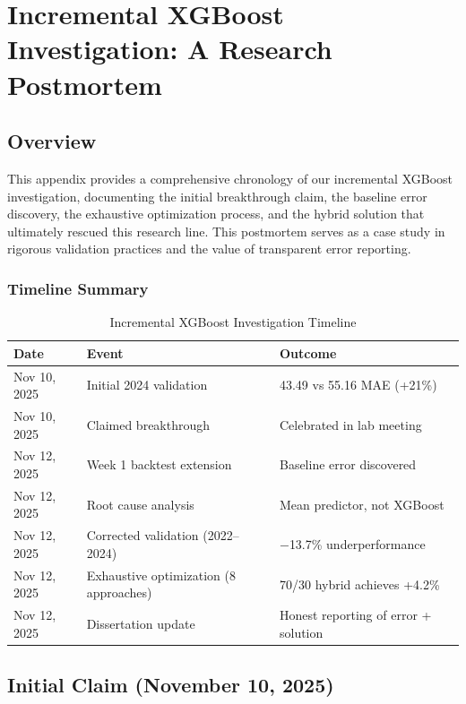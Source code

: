\chapter{Incremental XGBoost Investigation: A Research Postmortem}
\label{app:incremental-xgb}

\section{Overview}

This appendix provides a comprehensive chronology of our incremental XGBoost investigation, documenting the initial breakthrough claim, the baseline error discovery, the exhaustive optimization process, and the hybrid solution that ultimately rescued this research line. This postmortem serves as a case study in rigorous validation practices and the value of transparent error reporting.

\subsection{Timeline Summary}

\begin{table}[htbp]
\centering
\caption{Incremental XGBoost Investigation Timeline}
\label{tab:investigation-timeline}
\small
\setlength{\tabcolsep}{4pt}
\begin{tabular}{@{}llp{5.5cm}@{}}
\toprule
\textbf{Date} & \textbf{Event} & \textbf{Outcome} \\
\midrule
Nov 10, 2025 & Initial 2024 validation & 43.49 vs 55.16 MAE (+21\%) \\
Nov 10, 2025 & Claimed breakthrough & Celebrated in lab meeting \\
Nov 12, 2025 & Week 1 backtest extension & Baseline error discovered \\
Nov 12, 2025 & Root cause analysis & Mean predictor, not XGBoost \\
Nov 12, 2025 & Corrected validation (2022--2024) & $-$13.7\% underperformance \\
Nov 12, 2025 & Exhaustive optimization (8 approaches) & 70/30 hybrid achieves +4.2\% \\
Nov 12, 2025 & Dissertation update & Honest reporting of error + solution \\
\bottomrule
\end{tabular}
\end{table}

\section{Initial Claim (November 10, 2025)}


